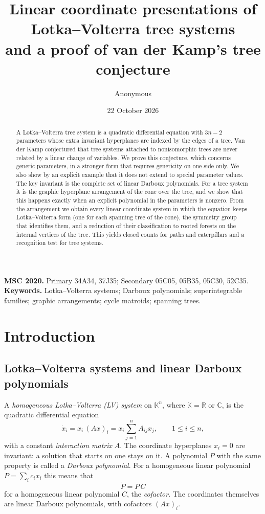 \documentclass[11pt,a4paper]{article}
\title{Linear coordinate presentations of Lotka--Volterra tree systems\\ and a proof of van der Kamp's tree conjecture}
\author{Anonymous}
\date{22 October 2026}
\theoremstyle{definition}
\theoremstyle{remark}
\newcommand{\K}{\mathbb K}
\begin{document}
\maketitle

\begin{abstract}
A Lotka--Volterra tree system is a quadratic differential equation with $3n-2$ parameters whose extra invariant hyperplanes are indexed by the edges of a tree. Van der Kamp conjectured that tree systems attached to nonisomorphic trees are never related by a linear change of variables. We prove this conjecture, which concerns generic parameters, in a stronger form that requires genericity on one side only. We also show by an explicit example that it does not extend to special parameter values. The key invariant is the complete set of linear Darboux polynomials. For a tree system it is the graphic hyperplane arrangement of the cone over the tree, and we show that this happens exactly when an explicit polynomial in the parameters is nonzero. From the arrangement we obtain every linear coordinate system in which the equation keeps Lotka--Volterra form (one for each spanning tree of the cone), the symmetry group that identifies them, and a reduction of their classification to rooted forests on the internal vertices of the tree. This yields closed counts for paths and caterpillars and a recognition test for tree systems.
\end{abstract}

\noindent\textbf{MSC 2020.} Primary 34A34, 37J35; Secondary 05C05, 05B35, 05C30, 52C35.\\
\textbf{Keywords.} Lotka--Volterra systems; Darboux polynomials; superintegrable families; graphic arrangements; cycle matroids; spanning trees.

\tableofcontents

\section{Introduction}
\label{lv:sec:introduction}

\subsection{Lotka--Volterra systems and linear Darboux polynomials}

A \emph{homogeneous Lotka--Volterra (LV) system} on $\K^n$, where $\K=\mathbb R$ or $\mathbb C$, is the quadratic differential equation
\begin{equation}
  \dot x_i=x_i\,(Ax)_i=x_i\sum_{j=1}^n A_{ij}x_j,
  \qquad 1\leq i\leq n,
  \label{lv:eq:lv}
\end{equation}
with a constant \emph{interaction matrix} $A$. The coordinate hyperplanes $x_i=0$ are invariant: a solution that starts on one stays on it. A polynomial $P$ with the same property is called a \emph{Darboux polynomial}. For a homogeneous linear polynomial $P=\sum_i c_ix_i$ this means that
\begin{equation}
  \dot P = P\,C
  \label{lv:eq:dp}
\end{equation}
for a homogeneous linear polynomial $C$, the \emph{cofactor}. The coordinates themselves are linear Darboux polynomials, with cofactors $(Ax)_i$.
\end{document}
